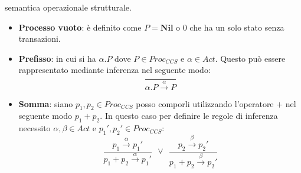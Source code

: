 semantica operazionale strutturale.
\begin{itemize}
    \item \textbf{Processo vuoto}: è definito come $P = \textbf{Nil}$ o 0 che ha
          un solo stato senza transazioni.
          \begin{center}
          \end{center}
    \item \textbf{Prefisso}: in cui si ha $\alpha . P$ dove $P \in Proc_{CCS}$
          e $\alpha \in Act$. Questo può essere rappresentato mediante inferenza nel
          seguente modo:
          \begin{equation}
              \frac{}{\alpha . P \xrightarrow{\alpha} P}
          \end{equation}
          \begin{center}
          \end{center}
    \item \textbf{Somma}: siano $p_1, p_2 \in Proc_{CCS}$ posso comporli
          utilizzando l'operatore $+$ nel seguente modo $p_1 + p_2$. In questo
          caso per definire le regole di inferenza necessito $\alpha, \beta \in
              Act$ e $p_1', p_2' \in Proc_{CCS}$:
          \begin{equation}
              \frac{p_1 \xrightarrow{\alpha} p_1'}{p_1 + p_2
                  \xrightarrow{\alpha} p_1'}
              \ \ \lor \ \
              \frac{p_2 \xrightarrow{\beta} p_2'}{p_1 + p_2
                  \xrightarrow{\beta} p_2'}
          \end{equation}
          \begin{center}
\end{center}
\end{itemize}
